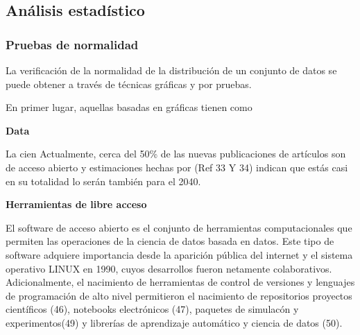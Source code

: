 \subsection{Análisis estadístico}

\subsubsection{Pruebas de normalidad}

La verificación de la normalidad de la distribución de un conjunto de datos se 
puede obtener a través de técnicas gráficas y por pruebas. 

En primer lugar, aquellas basadas en gráficas tienen como 

\textbf{Data}

La cien
Actualmente, cerca del 50\% de las nuevas publicaciones de artículos son de acceso abierto y estimaciones hechas por (Ref 33 Y 34) indican que 
estás casi en su totalidad lo serán también para el 2040.

\textbf{Herramientas de libre acceso}

El software de acceso abierto es el conjunto de herramientas computacionales que permiten 
las operaciones de la ciencia de datos basada en datos. Este tipo de software adquiere 
importancia desde la aparición pública del internet y el sistema operativo LINUX en 1990, 
cuyos desarrollos fueron netamente colaborativos. Adicionalmente, el nacimiento de 
herramientas de control de versiones y lenguajes de programación de alto nivel permitieron 
el nacimiento de repositorios proyectos científicos (46), notebooks electrónicos (47), 
paquetes de simulacón y experimentos(49) y librerías de aprendizaje automático y 
ciencia de datos (50). 